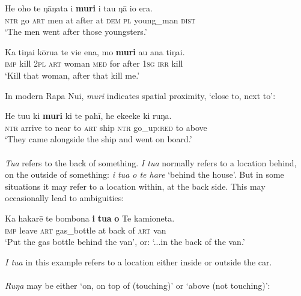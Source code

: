 \ea\label{ex:3.142}
\gll He oho te ŋāŋata {\ꞌ}i \textbf{muri} i tau ŋā io era. \\
\textsc{ntr} go \textsc{art} men at after at \textsc{dem} \textsc{pl} young\_man \textsc{dist} \\

\glt 
‘The men went after those youngsters.’ \textstyleExampleref{[Mtx-7-37.018]}
\z

\ea\label{ex:3.143}
\gll Ka tiŋa{\ꞌ}i kōrua te vi{\ꞌ}e ena, mo \textbf{muri} au ana tiŋa{\ꞌ}i. \\
\textsc{imp} kill \textsc{2pl} \textsc{art} woman \textsc{med} for after \textsc{1sg} \textsc{irr} kill \\

\glt
‘Kill that woman, after that kill me.’ \textstyleExampleref{[Mtx-7-21.037]}
\z

In modern Rapa Nui, \textit{muri} indicates spatial proximity, ‘close to, next to’:

\ea\label{ex:3.144}
\gll He tu{\ꞌ}u ki \textbf{muri} ki te pahī, he ekeeke ki ruŋa. \\
\textsc{ntr} arrive to near to \textsc{art} ship \textsc{ntr} go\_up:\textsc{red} to above \\

\glt 
‘They came alongside the ship and went on board.’ \textstyleExampleref{[R210.081]} 
\z

\paragraph{}\label{sec:3.6.2.3.2} \textit{Tu{\ꞌ}a} refers to the back of something. \textit{{\ꞌ}I tu{\ꞌ}a} normally refers to a location behind, on the outside of something: \textit{{\ꞌ}i tu{\ꞌ}a o te hare} ‘behind the house’. But in some situations it may refer to a location within, at the back side. This may occasionally lead to ambiguities:

\ea\label{ex:3.145}
\gll Ka hakarē te bombona \textbf{{\ꞌ}i} \textbf{tu{\ꞌ}a} \textbf{o} Te kamioneta. \\
\textsc{imp} leave \textsc{art} gas\_bottle at back of \textsc{art} van \\

\glt
‘Put the gas bottle behind the van’, or: ‘...in the back of the van.’
\z

\textit{{\ꞌ}I tu{\ꞌ}a} in this example refers to a location either inside or outside the car. 

\paragraph{}\label{sec:3.6.2.3.3} \textit{Ruŋa} may be either ‘on, on top of (touching)’ or ‘above (not touching)’:

